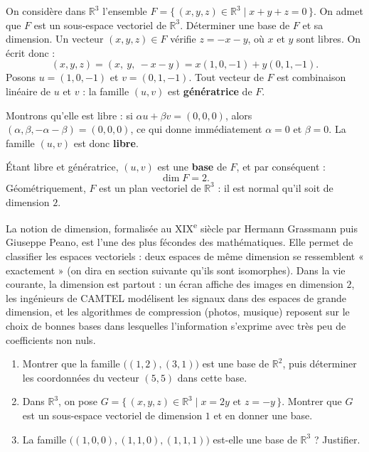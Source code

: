\documentclass[11pt]{article}
\begin{document}
\begin{exoresolu}
On considère dans $\mathbb{R}^3$ l'ensemble $F = \{\,(x,y,z) \in \mathbb{R}^3 \mid x + y + z = 0\,\}$. On admet que $F$ est un sous-espace vectoriel de $\mathbb{R}^3$. Déterminer une base de $F$ et sa dimension.
\tcblower
Un vecteur $(x,y,z) \in F$ vérifie $z = -x - y$, où $x$ et $y$ sont libres. On écrit donc :
\[ (x,y,z) = (x,\ y,\ -x-y) = x(1,0,-1) + y(0,1,-1). \]
Posons $u = (1,0,-1)$ et $v = (0,1,-1)$. Tout vecteur de $F$ est combinaison linéaire de $u$ et $v$ : la famille $(u,v)$ est \textbf{génératrice} de $F$.

Montrons qu'elle est libre : si $\alpha u + \beta v = (0,0,0)$, alors $(\alpha, \beta, -\alpha-\beta) = (0,0,0)$, ce qui donne immédiatement $\alpha = 0$ et $\beta = 0$. La famille $(u,v)$ est donc \textbf{libre}.

Étant libre et génératrice, $(u,v)$ est une \textbf{base} de $F$, et par conséquent :
\[ \dim F = 2. \]
Géométriquement, $F$ est un plan vectoriel de $\mathbb{R}^3$ : il est normal qu'il soit de dimension $2$.
\end{exoresolu}

\begin{savaistu}
La notion de dimension, formalisée au XIX\textsuperscript{e} siècle par Hermann Grassmann puis Giuseppe Peano, est l'une des plus fécondes des mathématiques. Elle permet de classifier les espaces vectoriels : deux espaces de même dimension se ressemblent « exactement » (on dira en section suivante qu'ils sont isomorphes). Dans la vie courante, la dimension est partout : un écran affiche des images en dimension $2$, les ingénieurs de CAMTEL modélisent les signaux dans des espaces de grande dimension, et les algorithmes de compression (photos, musique) reposent sur le choix de bonnes bases dans lesquelles l'information s'exprime avec très peu de coefficients non nuls.
\end{savaistu}

\begin{exercice}
\begin{enumerate}
\item Montrer que la famille $\big((1,2), (3,1)\big)$ est une base de $\mathbb{R}^2$, puis déterminer les coordonnées du vecteur $(5,5)$ dans cette base.
\item Dans $\mathbb{R}^3$, on pose $G = \{\,(x,y,z) \in \mathbb{R}^3 \mid x = 2y \text{ et } z = -y\,\}$. Montrer que $G$ est un sous-espace vectoriel de dimension $1$ et en donner une base.
\item La famille $\big((1,0,0), (1,1,0), (1,1,1)\big)$ est-elle une base de $\mathbb{R}^3$ ? Justifier.
\end{enumerate}
\end{exercice}
\end{document}
